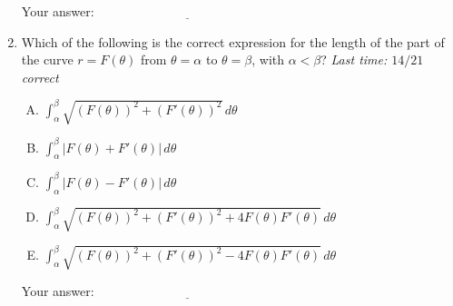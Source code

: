 \documentclass[10pt]{amsart}
\begin{document}
\begin{enumerate}
  \vspace{0.1in}
  Your answer: $\underline{\qquad\qquad\qquad\qquad\qquad\qquad\qquad}$
  \vspace{0.6in}

\item Which of the following is the correct expression for the length
  of the part of the curve $r = F(\theta)$ from $\theta = \alpha$ to
  $\theta = \beta$, with $\alpha < \beta$? {\em Last time: $14/21$
    correct}

  \begin{enumerate}[(A)]
  \item $\int_\alpha^\beta \sqrt{(F(\theta))^2 + (F'(\theta))^2} \, d\theta$
  \item $\int_\alpha^\beta |F(\theta) + F'(\theta)| \, d\theta$
  \item $\int_\alpha^\beta |F(\theta) - F'(\theta)| \, d\theta$
  \item $\int_\alpha^\beta \sqrt{(F(\theta))^2 + (F'(\theta))^2 + 4F(\theta)F'(\theta)} \, d\theta$
  \item $\int_\alpha^\beta \sqrt{(F(\theta))^2 + (F'(\theta))^2 - 4F(\theta)F'(\theta)} \, d\theta$
  \end{enumerate}

  \vspace{0.1in}
  Your answer: $\underline{\qquad\qquad\qquad\qquad\qquad\qquad\qquad}$
  \vspace{0.6in}

\end{enumerate}
\end{document}

